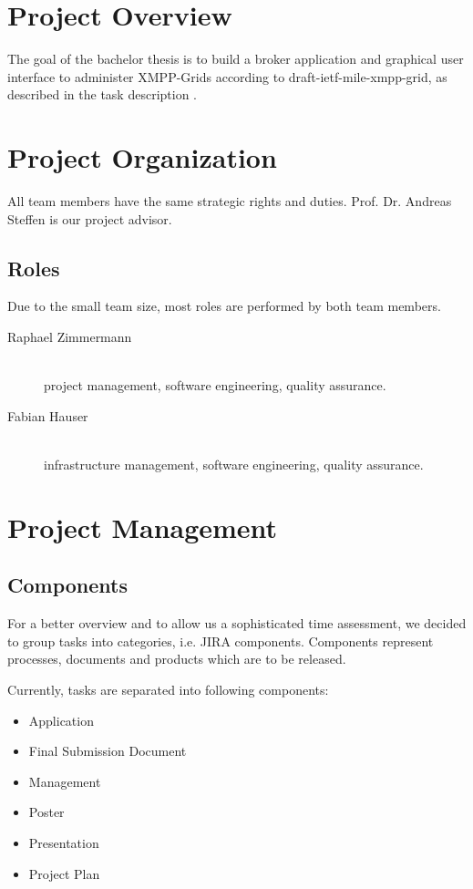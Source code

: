 \tableofcontents %


\mainmatter
\chapter{Project Overview}
The goal of the bachelor thesis is to build a broker application and graphical user interface to administer XMPP-Grids according to draft-ietf-mile-xmpp-grid, as described in the task description \cite{taskdescription}.


\chapter{Project Organization}
All team members have the same strategic rights and duties. Prof. Dr. Andreas Steffen is our project advisor.

\section{Roles}
Due to the small team size, most roles are performed by both team members.

\begin{description}
    \item[Raphael Zimmermann] \hfill \\
        project management, software engineering, quality assurance.
    \item[Fabian Hauser] \hfill \\
        infrastructure management, software engineering, quality assurance.
\end{description}

\chapter{Project Management}
\section{Components}
For a better overview and to allow us a sophisticated time assessment, we decided to group tasks into categories, i.e. JIRA components. Components represent processes, documents and products which are to be released.

Currently, tasks are separated into following components:

\begin{multicols}{2}
    \begin{itemize}
        \item Application
        \item Final Submission Document
        \item Management
        \item Poster
        \item Presentation
        \item Project Plan
    \end{itemize}
\end{multicols}

